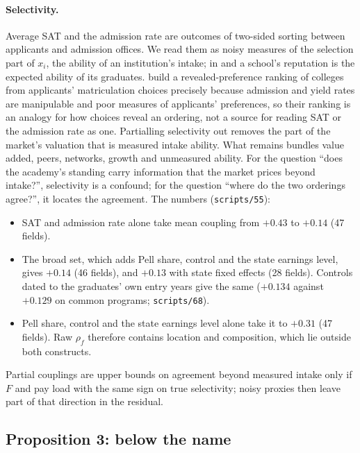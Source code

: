 \paragraph{Selectivity.} Average SAT and the admission rate are outcomes of two-sided sorting between applicants
and admission offices. We read them as noisy measures of the selection part of $x_i$, the ability of an
institution's intake; in \citet{macleod2015reputation} and \citet{macleod2017big} a school's reputation is the
expected ability of its graduates. \citet{avery2013revealed} build a revealed-preference ranking of colleges from
applicants' matriculation choices precisely because admission and yield rates are manipulable and poor measures of
applicants' preferences, so their ranking is an analogy for how choices reveal an ordering, not a source for
reading SAT or the admission rate as one. Partialling selectivity out removes the part of the market's valuation
that is measured intake ability. What remains bundles value added, peers, networks, growth and unmeasured
ability. For the question ``does the academy's standing carry information that the market prices beyond
intake?'', selectivity is a confound; for the question ``where do the two orderings agree?'', it locates the
agreement. The numbers (\texttt{scripts/55}):
\begin{itemize}
\item SAT and admission rate alone take mean coupling from $+0.43$ to $+0.14$ (47 fields).
\item The broad set, which adds Pell share, control and the state earnings level, gives $+0.14$ (46 fields), and
$+0.13$ with state fixed effects (28 fields). Controls dated to the graduates' own entry years give the same
($+0.134$ against $+0.129$ on common programs; \texttt{scripts/68}).
\item Pell share, control and the state earnings level alone take it to $+0.31$ (47 fields). Raw $\rho_f$
therefore contains location and composition, which lie outside both constructs.
\end{itemize}
Partial couplings are upper bounds on agreement beyond measured intake only if $F$ and pay load with the same
sign on true selectivity; noisy proxies then leave part of that direction in the residual.

\subsection{Proposition 3: below the name}\label{si:theory:umbrella}


